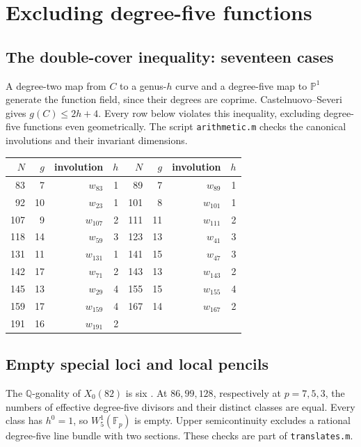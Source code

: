 \documentclass[11pt,a4paper]{article}
\newcommand{\Q}{\mathbb Q}
\newcommand{\F}{\mathbb F}
\begin{document}
\section{Excluding degree-five functions}\label{sec:functions}
\subsection{The double-cover inequality: seventeen cases}
A degree-two map from $C$ to a genus-$h$ curve and a degree-five map
to $\mathbb P^1$ generate the function field, since their degrees are
coprime. Castelnuovo--Severi gives $g(C)\le2h+4$.
Every row below violates this inequality, excluding degree-five functions
even geometrically. The script \texttt{arithmetic.m} checks the canonical
involutions and their invariant dimensions.
\begin{center}\small
\begin{tabular}{@{}rrrr@{\qquad}rrrr@{}}
\toprule
$N$&$g$&involution&$h$&$N$&$g$&involution&$h$\\
\midrule
83&7&$w_{83}$&1&89&7&$w_{89}$&1\\
92&10&$w_{23}$&1&101&8&$w_{101}$&1\\
107&9&$w_{107}$&2&111&11&$w_{111}$&2\\
118&14&$w_{59}$&3&123&13&$w_{41}$&3\\
131&11&$w_{131}$&1&141&15&$w_{47}$&3\\
142&17&$w_{71}$&2&143&13&$w_{143}$&2\\
145&13&$w_{29}$&4&155&15&$w_{155}$&4\\
159&17&$w_{159}$&4&167&14&$w_{167}$&2\\
191&16&$w_{191}$&2&&&&\\
\bottomrule
\end{tabular}
\end{center}

\subsection{Empty special loci and local pencils}
The $\Q$-gonality of $X_0(82)$ is six \cite[Theorem~1.4]{NO}.
At $86,99,128$, respectively at $p=7,5,3$, the numbers of effective
degree-five divisors and their distinct classes are equal. Every class
has $h^0=1$, so $W^1_5(\F_p)$ is empty. Upper semicontinuity excludes
a rational degree-five line bundle with two sections.
These checks are part of \texttt{translates.m}.
\end{document}
